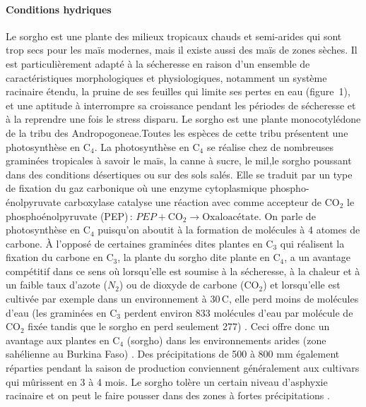 \documentclass[a4paper,11pt]{article}
\begin{document}
\paragraph{Conditions hydriques} Le sorgho est une plante des milieux
tropicaux chauds et semi-arides qui sont trop secs pour les maïs
modernes, mais il existe aussi des maïs de zones sèches. Il est
particulièrement adapté à la sécheresse en raison d'un ensemble de
caractéristiques morphologiques et physiologiques, notamment un
système racinaire étendu, la pruine de ses feuilles qui limite ses
pertes en eau (figure~1), et une aptitude à interrompre sa croissance
pendant les périodes de sécheresse et à la reprendre une fois le
stress disparu. Le sorgho est une plante monocotylédone de la tribu
des Andropogoneae.Toutes les espèces de cette tribu présentent une
photosynthèse en $\text{C}_4$. La photosynthèse en $\text{C}_4$ se
réalise chez de nombreuses graminées tropicales à savoir le maïs, la
canne à sucre, le mil,le sorgho poussant dans des conditions
désertiques ou sur des sols salés. Elle se traduit par un type de
fixation du gaz carbonique où une enzyme cytoplasmique
phospho-énolpyruvate carboxylase catalyse une réaction avec comme
accepteur de $\text{CO}_2$ le phosphoénolpyruvate (PEP)\,:
$PEP + \text{CO}_2 \longrightarrow \text{Oxaloacétate}$. On parle de
photosynthèse en $\text{C}_4$ puisqu'on aboutit à la formation de
molécules à 4 atomes de carbone. À l'opposé de certaines graminées
dites plantes en $\text{C}_3$ qui réalisent la fixation du carbone en
$\text{C}_3$, la plante du sorgho dite plante en $\text{C}_4$, a un
avantage compétitif dans ce sens où lorsqu'elle est soumise à la
sécheresse, à la chaleur et à un faible taux d'azote ($N_2$) ou de
dioxyde de carbone ($\text{CO}_2$) et lorsqu'elle est cultivée par
exemple dans un environnement à 30\,\degree{}C, elle perd moins de
molécules d'eau (les graminées en $\text{C}_3$ perdent environ 833
molécules d'eau par molécule de $\text{CO}_2$ fixée tandis que le
sorgho en perd seulement 277) \cite{sage1998c4}. Ceci offre donc un
avantage aux plantes en $\text{C}_4$ (sorgho) dans les environnements
arides (zone sahélienne au Burkina Faso) \cite{sage1998c4}. Des
précipitations de 500 à 800 mm également réparties pendant la saison
de production conviennent généralement aux cultivars qui mûrissent en
3 à 4 mois. Le sorgho tolère un certain niveau d'asphyxie racinaire et
on peut le faire pousser dans des zones à fortes précipitations
\cite{BARRO_KONDOMBO_2010}.
\end{document}

